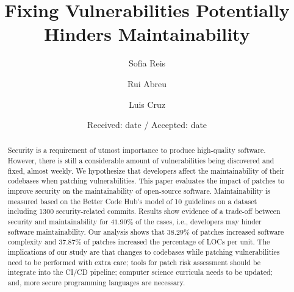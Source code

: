 \documentclass[smallextended]{svjour3}       %
\begin{document}
\title{Fixing Vulnerabilities Potentially Hinders Maintainability}

\author{Sofia Reis         \and
        Rui Abreu           \and
        Luis Cruz
}


\date{Received: date / Accepted: date}


\maketitle

\begin{abstract}
Security is a requirement of utmost importance to produce 
high-quality software. However, there is still a considerable amount 
of vulnerabilities being discovered and fixed, almost weekly. We 
hypothesize that developers affect the maintainability of their 
codebases when patching vulnerabilities. This paper evaluates the 
impact of patches to improve security on the maintainability of 
open-source software. Maintainability is measured based on the 
Better Code Hub’s model of 10 guidelines on a dataset including 
1300 security-related commits. Results show evidence of a trade-off 
between security and maintainability for $41.90\%$ of the cases, i.e., developers 
may hinder software maintainability. Our analysis shows that $38.29\%$ of patches increased
software complexity and $37.87\%$ of patches increased the percentage 
of LOCs per unit. The implications of our study 
are that changes to codebases while patching vulnerabilities need to 
be performed with extra care; tools for patch risk assessment should 
be integrate into the CI/CD pipeline; computer science curricula 
needs to be updated; and, more secure programming languages are 
necessary.
\end{abstract}
\end{document}
